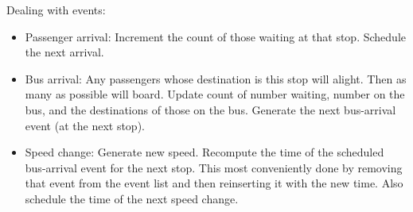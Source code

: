 \documentclass{article}
\begin{document}
Dealing with events:

\begin{itemize}

\item Passenger arrival:  Increment the count of those waiting at that
stop.  Schedule the next arrival.

\item Bus arrival:  Any passengers whose destination is this stop will
alight.  Then as many as possible will board.  Update count of number
waiting, number on the bus, and the destinations of those on the bus.
Generate the next bus-arrival event (at the next stop).

\item Speed change:  Generate new speed.  Recompute the time of the
scheduled bus-arrival event for the next stop.  This most conveniently
done by removing that event from the event list and then reinserting it
with the new time.  Also schedule the time of the next speed change.

\end{itemize}
\end{document}
